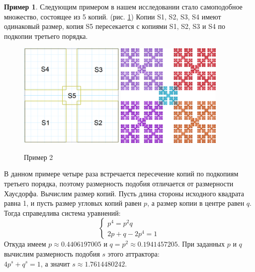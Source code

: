 \documentclass[a4paper,14pt]{extarticle} %
\newcommand{\0}{\varnothing}
\newcommand{\8}{\infty}
\theoremstyle{definition}
\newtheorem{example}{Пример}
\begin{document}
\begin{example}\label{ex:2}
Следующим примером в нашем исследовании стало самоподобное множество, состоящее из 5 копий. (рис. \ref{fig:primer2_skelet}) 
Копии S1, S2, S3, S4 имеют одинаковый размер, копия S5 пересекается с копиями S1, S2, S3 и S4 по подкопии третьего порядка. 

\begin{figure}[H]
    \centering
    \includegraphics[width=0.45\textwidth]{1_1_скелет.png}
    \hfill
    \includegraphics[width=0.45\textwidth]{1_1.png}
    \caption{Пример 2}
    \label{fig:primer2_skelet}
\end{figure}
В данном примере четыре раза встречается пересечение копий по подкопиям третьего порядка, поэтому размерность подобия отличается от размерности Хаусдорфа. 
Вычислим размер копий. Пусть длина стороны исходного квадрата равна 1, и пусть размер угловых копий  равен $p$, а размер копии в центре равен $q$.
Тогда справедлива система уравнений:
$$
\begin{cases}
p^4 = p^2q\\
2p + q - 2p^4 = 1
\end{cases}
$$
Откуда имеем $p\approx0.4406197005$ и $q=p^2\approx0.1941457205$.
При заданных $p$ и $q$ вычислим размерность подобия $s$ этого аттрактора:\\
$4p^s+q^s=1$, а значит $s\approx1.7614480242$. 


\end{example}
\end{document}
